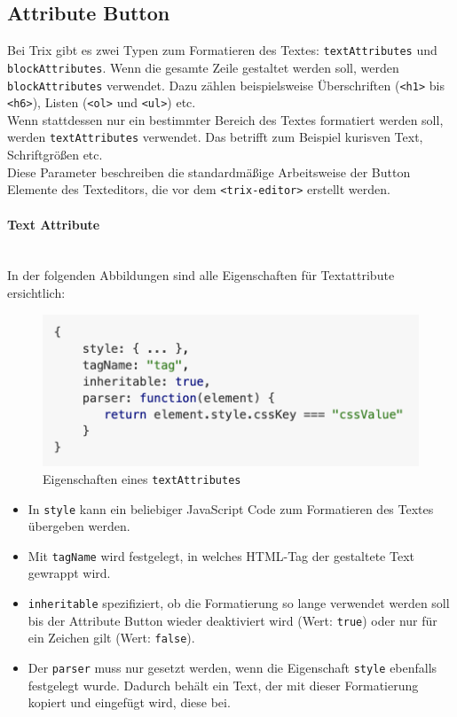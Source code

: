 \subsection{Attribute Button}
Bei Trix gibt es zwei Typen zum Formatieren des Textes: \texttt{textAttributes} und \\
\texttt{blockAttributes}. Wenn die gesamte Zeile gestaltet werden soll, werden \\
\texttt{blockAttributes} verwendet. Dazu zählen beispielsweise Überschriften (\texttt{<h1>} bis \texttt{<h6>}), Listen (\texttt{<ol>} 
und \texttt{<ul>}) etc.\\ Wenn stattdessen nur ein bestimmter Bereich des Textes formatiert werden soll, werden 
\texttt{textAttributes} verwendet. Das betrifft zum Beispiel kurisven Text, Schriftgrößen etc.\\
Diese Parameter beschreiben die standardmäßige Arbeitsweise der Button Elemente des Texteditors, die vor dem 
\texttt{<trix-editor>} erstellt werden.

\paragraph{Text Attribute}
\label{paragraph_textAttribute}\mbox{}\\
In der folgenden Abbildungen sind alle Eigenschaften für Textattribute ersichtlich:

\begin{figure}[H]
\begin{center}
	\includegraphics[scale=.7]{images/text_attributes.png}
\end{center}
	\caption{Eigenschaften eines \texttt{textAttributes}}
\end{figure}

\begin{itemize}
	\item In \texttt{style} kann ein beliebiger JavaScript Code zum Formatieren des Textes übergeben werden.
	\item Mit \texttt{tagName} wird festgelegt, in welches HTML-Tag der gestaltete Text gewrappt wird.
	\item \texttt{inheritable} spezifiziert, ob die Formatierung so lange verwendet werden soll bis der Attribute Button wieder deaktiviert wird (Wert: \texttt{true}) oder nur für ein Zeichen gilt (Wert: \texttt{false}). 
	\item Der \texttt{parser} muss nur gesetzt werden, wenn die Eigenschaft \texttt{style} ebenfalls festgelegt wurde. Dadurch behält ein Text, der mit dieser Formatierung kopiert und eingefügt wird, diese bei.
\end{itemize}


